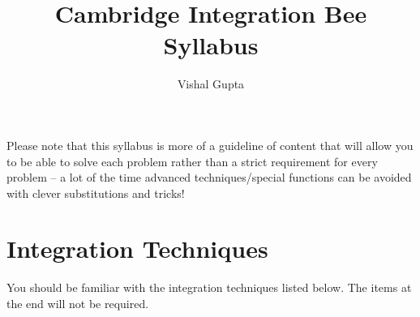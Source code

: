 \documentclass[11pt]{scrartcl}
\begin{document}
\title{Cambridge Integration Bee Syllabus}
\author{Vishal Gupta}
\maketitle

Please note that this syllabus is more of a guideline of content that will allow you to be able to solve each problem rather than a strict requirement for every problem -- a lot of the time advanced techniques/special functions can be avoided with clever substitutions and tricks!

\section{Integration Techniques}

You should be familiar with the integration techniques listed below. The items at the end will not be required.
\end{document}
